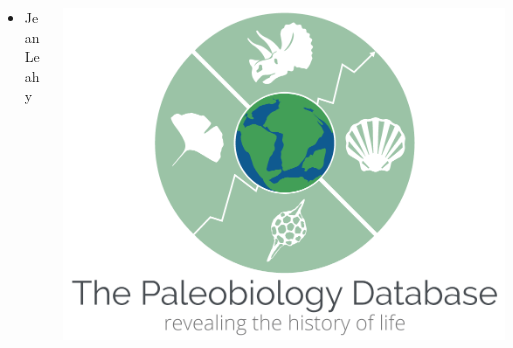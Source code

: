 \documentclass{beamer}
\begin{document}
\begin{frame}
\begin{columns}
\begin{column}{0.35\textwidth}
\begin{itemize}
        \item \tiny{Jean Leahy}
      \end{itemize}
    \end{column}
    \begin{column}{0.25\textwidth}
      \includegraphics[width=\textwidth,height=\textheight,keepaspectratio=true]{figure/paleodb}
    \end{column}
  \end{columns}
\end{frame}
\end{document}
